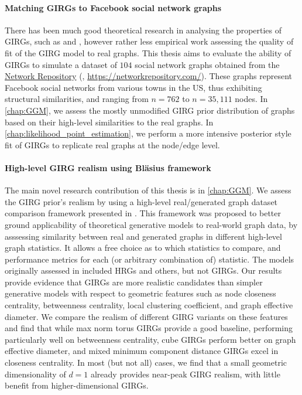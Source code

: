 \paragraph{Matching GIRGs to Facebook social network graphs} There has been much good theoretical research in analysing the properties of GIRGs, such as \cite{bringmann2019geometric} and \cite{bringmann2017greedy}, however rather less empirical work assessing the quality of fit of the GIRG model to real graphs. This thesis aims to evaluate the ability of GIRGs to simulate a dataset of $104$ social network graphs obtained from the \href{https://networkrepository.com/}{Network Repository} (\cite{rossi2015network}, \url{https://networkrepository.com/}). These graphs represent Facebook social networks from various towns in the US, thus exhibiting structural similarities, and ranging from $n=762$ to $n=35,111$ nodes.
In \cref{chap:GGM}, we assess the mostly unmodified GIRG prior distribution of graphs based on their high-level similarities to the real graphs. In \cref{chap:likelihood_point_estimation}, we perform a more intensive posterior style fit of GIRGs to replicate real graphs at the node/edge level.

\paragraph{High-level GIRG realism using Bl{\"a}sius framework} The main novel research contribution of this thesis is in \cref{chap:GGM}. We assess the GIRG prior's realism by using a high-level real/generated graph dataset comparison framework presented in \cite{blasius2018towards}.
This framework was proposed to better ground applicability of theoretical generative models to real-world graph data, by asssessing similarity between real and generated graphs in different high-level graph statistics.
It allows a free choice as to which statistics to compare, and performance metrics for each (or arbitrary combination of) statistic.
The models originally assessed in \cite{blasius2018towards} included HRGs and others, but not GIRGs.
Our results provide evidence that GIRGs are more realistic candidates than simpler generative models with respect to geometric features such as node closeness centrality, betweenness centrality, local clustering coefficient, and graph effective diameter.
We compare the realism of different GIRG variants on these features and find that while max norm torus GIRGs provide a good baseline, performing particularly well on betweenness centrality, cube GIRGs perform better on graph effective diameter, and mixed minimum component distance GIRGs excel in closeness centrality.
In most (but not all) cases, we find that a small geometric dimensionality of $d=1$ already provides near-peak GIRG realism, with little benefit from higher-dimensional GIRGs.

